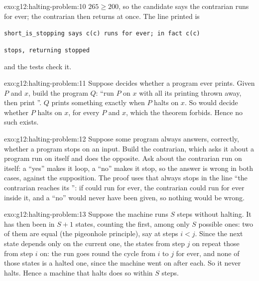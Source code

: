 \begin{solution}{exo:g12:halting-problem:10}
$265 \ge 200$, so the candidate says the contrarian runs for ever; the contrarian then returns at once. The line
printed is

\smallskip\noindent\hspace*{2em}\texttt{short\_is\_stopping says c(c) runs for ever; in fact c(c)}

\noindent\hspace*{4em}\texttt{stops, returning \textquotesingle{}stopped\textquotesingle{}}

\smallskip\noindent and the tests check it.
\end{solution}

\begin{solution}{exo:g12:halting-problem:11}
Suppose  decides whether a program ever prints. Given $P$ and $x$, build the program $Q$:
``run $P$ on $x$ with all its printing thrown away, then print ''. $Q$ prints something exactly when $P$
halts on $x$. So  would decide whether $P$ halts on $x$, for every $P$ and $x$, which the theorem
forbids. Hence no such  exists.
\end{solution}

\begin{solution}{exo:g12:halting-problem:12}
Suppose some program always answers, correctly, whether a program stops on an input. Build the contrarian, which asks
it about a program run on itself and does the opposite. Ask about the contrarian run on itself: a ``yes'' makes it
loop, a ``no'' makes it stop, so the answer is wrong in both cases, against the supposition. The proof uses that
 always stops in the line ``the contrarian reaches its '': if  could run for ever,
the contrarian could run for ever inside it, and a ``no'' would never have been given, so nothing would be wrong.
\end{solution}

\begin{solution}{exo:g12:halting-problem:13}
Suppose the machine runs $S$ steps without halting. It has then been in $S + 1$ states, counting the first, among only
$S$ possible ones: two of them are equal (the pigeonhole principle), say at steps $i < j$. Since the next state depends
only on the current one, the states from step $j$ on repeat those from step $i$ on: the run goes round the cycle from
$i$ to $j$ for ever, and none of those states is a halted one, since the machine went on after each. So it never
halts. Hence a machine that halts does so within $S$ steps.
\end{solution}


